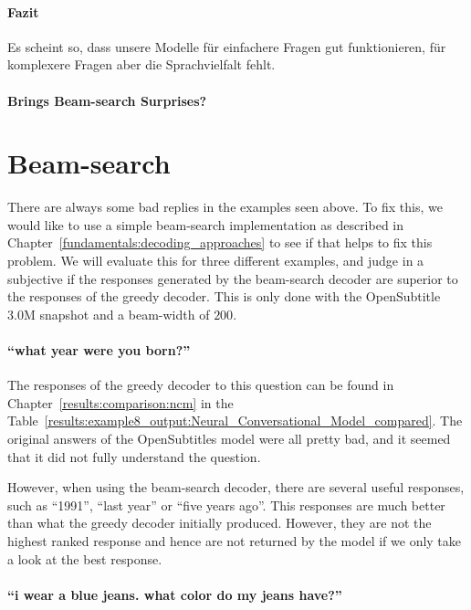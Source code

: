 \paragraph{Fazit} Es scheint so, dass unsere Modelle für einfachere Fragen gut funktionieren, für komplexere Fragen aber die Sprachvielfalt fehlt. 

\paragraph{Brings Beam-search Surprises?}

\section{Beam-search}
There are always some bad replies in the examples seen above. To fix this, we would like to use a simple beam-search implementation as described in Chapter~\ref{fundamentals:decoding_approaches} to see if that helps to fix this problem. We will evaluate this for three different examples, and judge in a subjective if the responses generated by the beam-search decoder are superior to the responses of the greedy decoder. This is only done with the OpenSubtitle 3.0M snapshot and a beam-width of $200$.

\paragraph{``what year were you born?''} The responses of the greedy decoder to this question can be found in Chapter~\ref{results:comparison:ncm} in the Table~\ref{results:example8_output:Neural_Conversational_Model_compared}. The original answers of the OpenSubtitles model were all pretty bad, and it seemed that it did not fully understand the question.

However, when using the beam-search decoder, there are several useful responses, such as ``1991'', ``last year'' or ``five years ago''. This responses are much better than what the greedy decoder initially produced. However, they are not the highest ranked response and hence are not returned by the model if we only take a look at the best response.

\paragraph{``i wear a blue jeans. what color do my jeans have?''} \blindtext
